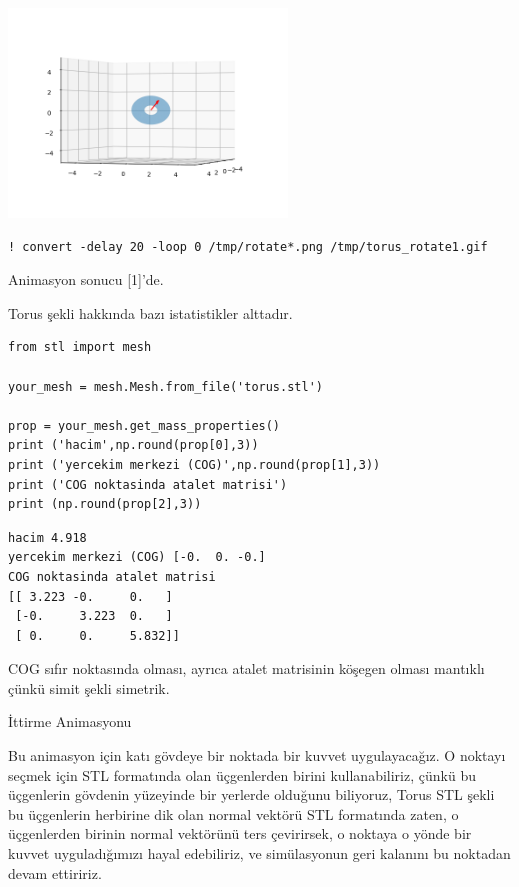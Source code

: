 \documentclass[12pt,fleqn]{article}\usepackage{../../common}
\begin{document}
\includegraphics[width=20em]{sim1/rotate_14.png}

\begin{verbatim}
! convert -delay 20 -loop 0 /tmp/rotate*.png /tmp/torus_rotate1.gif
\end{verbatim}

Animasyon sonucu [1]'de.

Torus şekli hakkında bazı istatistikler alttadır.

\begin{verbatim}
from stl import mesh

your_mesh = mesh.Mesh.from_file('torus.stl')

prop = your_mesh.get_mass_properties()
print ('hacim',np.round(prop[0],3))
print ('yercekim merkezi (COG)',np.round(prop[1],3))
print ('COG noktasinda atalet matrisi')
print (np.round(prop[2],3))
\end{verbatim}

\begin{verbatim}
hacim 4.918
yercekim merkezi (COG) [-0.  0. -0.]
COG noktasinda atalet matrisi
[[ 3.223 -0.     0.   ]
 [-0.     3.223  0.   ]
 [ 0.     0.     5.832]]
\end{verbatim}

COG sıfır noktasında olması, ayrıca atalet matrisinin köşegen olması mantıklı
çünkü simit şekli simetrik.

İttirme Animasyonu

Bu animasyon için katı gövdeye bir noktada bir kuvvet uygulayacağız. O noktayı
seçmek için STL formatında olan üçgenlerden birini kullanabiliriz, çünkü bu
üçgenlerin gövdenin yüzeyinde bir yerlerde olduğunu biliyoruz, Torus STL şekli
bu üçgenlerin herbirine dik olan normal vektörü STL formatında zaten, o
üçgenlerden birinin normal vektörünü ters çevirirsek, o noktaya o yönde bir
kuvvet uyguladığımızı hayal edebiliriz, ve simülasyonun geri kalanını bu
noktadan devam ettiririz.
\end{document}
